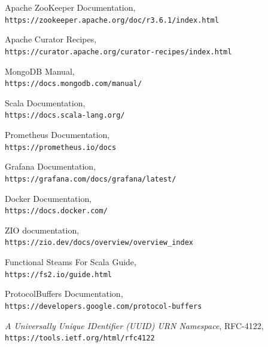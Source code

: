 \documentclass[14pt]{article}
\begin{document}
\begin{thebibliography}{9}
Apache ZooKeeper Documentation,\\
\texttt{https://zookeeper.apache.org/doc/r3.6.1/index.html}

Apache Curator Recipes,\\
\texttt{https://curator.apache.org/curator-recipes/index.html}

MongoDB Manual,\\
\texttt{https://docs.mongodb.com/manual/}

Scala Documentation,\\
\texttt{https://docs.scala-lang.org/}

Prometheus Documentation,\\
\texttt{https://prometheus.io/docs}

Grafana Documentation,\\
\texttt{https://grafana.com/docs/grafana/latest/}

Docker Documentation,\\
\texttt{https://docs.docker.com/}

ZIO documentation,\\
\texttt{https://zio.dev/docs/overview/overview\_index}

Functional Steams For Scala Guide,\\
\texttt{https://fs2.io/guide.html}

ProtocolBuffers Documentation,\\
\texttt{https://developers.google.com/protocol-buffers}

\textit{A Universally Unique IDentifier (UUID) URN Namespace},
RFC-4122,\\
\texttt{https://tools.ietf.org/html/rfc4122}

\end{thebibliography}
\end{document}

